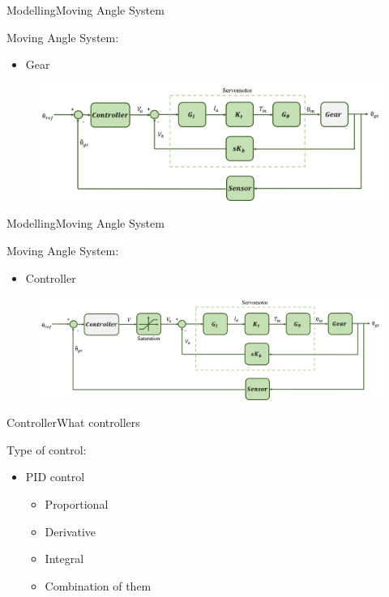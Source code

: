 \begin{frame}{Modelling}{Moving Angle System}
  \begin{block}{Moving Angle System:}
	  \begin{itemize}
	  	\item Gear
	  \end{itemize}
	  \begin{figure}
        \includegraphics[scale=0.26]{../report/figures/servo+gear+noise+gear.png}
      \end{figure}  
  \end{block}
\end{frame}


\begin{frame}{Modelling}{Moving Angle System}
  \begin{block}{Moving Angle System:}
	  \begin{itemize}
	  	\item Controller
	  \end{itemize}
	  \begin{figure}
        \includegraphics[scale=0.26]{../report/figures/servo+gear+noise+controller.png}
      \end{figure}
  \end{block}
\end{frame}


\begin{frame}{Controller}{What controllers}
  \begin{block}{Type of control:}

	  \begin{itemize}
	  	\item PID control
	 	\begin{itemize}
	  	\item Proportional
	  	\item Derivative
	  	\item Integral
	  	\item Combination of them
	  \end{itemize}
	  \end{itemize}


  \end{block}
\end{frame}


